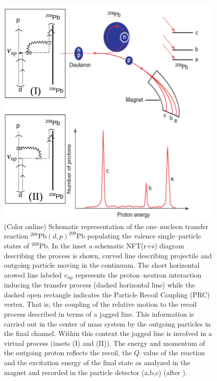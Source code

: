 \begin{figure}
\centerline {
\includegraphics*[width=12cm]{introduccion/figs/figintro2}
}
\caption{(Color online) Schematic  representation of the one--nucleon transfer reaction $^{208}$Pb$(d,p)^{209}$Pb populating the valence single--particle states of $^{209}$Pb. In the inset a schematic NFT(r+s) diagram describing the process is shown, curved line describing projectile and outgoing particle moving in the continuum. The short horizontal arowed line labeled $v_{np}$ represents the proton--neutron interaction inducing the transfer process (dashed horizontal line) while the dashed open rectangle indicates the Particle Recoil Coupling (PRC) vertex. That is,  the coupling of the relative motion to the recoil process described in terms of a jagged line. This information is carried out in the center of mass system by the outgoing particles in the final channel. Within this context the jagged line is involved in a virtual process (insets (I) and (II)). The energy and momentum of the outgoing proton reflects the recoil, the  $Q$--value of the reaction and the excitation energy of the final state as analyzed in the magnet and recorded in the particle detector (a,b,c) (after \cite{Mottelson:76b}).}
\label{figintro2}
\end{figure}

